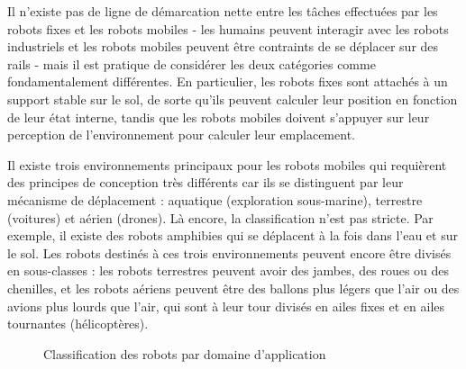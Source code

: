 {Il n'existe pas de ligne de démarcation nette entre les tâches effectuées par les robots fixes et les robots mobiles - les humains peuvent interagir avec les robots industriels et les robots mobiles peuvent être contraints de se déplacer sur des rails - mais il est pratique de considérer les deux catégories comme fondamentalement différentes. En particulier, les robots fixes sont attachés à un support stable sur le sol, de sorte qu'ils peuvent calculer leur position en fonction de leur état interne, tandis que les robots mobiles doivent s'appuyer sur leur perception de l'environnement pour calculer leur emplacement.

Il existe trois environnements principaux pour les robots mobiles qui requièrent des principes de conception très différents car ils se distinguent par leur mécanisme de déplacement : aquatique (exploration sous-marine), terrestre (voitures) et aérien (drones). Là encore, la classification n'est pas stricte. Par exemple, il existe des robots amphibies qui se déplacent à la fois dans l'eau et sur le sol. Les robots destinés à ces trois environnements peuvent encore être divisés en sous-classes : les robots terrestres peuvent avoir des jambes, des roues ou des chenilles, et les robots aériens peuvent être des ballons plus légers que l'air ou des avions plus lourds que l'air, qui sont à leur tour divisés en ailes fixes et en ailes tournantes (hélicoptères).

\begin{figure}
\begin{center}
\end{center}
\caption{Classification des robots par domaine d'application}\label{fig.classification2}
\end{figure}

}
